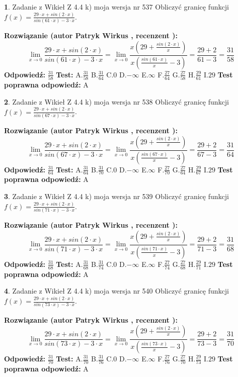 \documentclass[12pt, a4paper]{article}
\theoremstyle{definition} %
\newtheorem{zad}{}
\newcommand{\zadStart}[1]{\begin{zad}#1\newline}
\newcommand{\zadStop}{\end{zad}}
\newcommand{\rozwStart}[2]{\noindent \textbf{Rozwiązanie (autor #1 , recenzent #2): }\newline}
\newcommand{\rozwStop}{\newline}
\newcommand{\odpStart}{\noindent \textbf{Odpowiedź:}\newline}
\newcommand{\odpStop}{\newline}
\newcommand{\testStart}{\noindent \textbf{Test:}\newline}
\newcommand{\testStop}{\newline}
\newcommand{\kluczStart}{\noindent \textbf{Test poprawna odpowiedź:}\newline}
\newcommand{\kluczStop}{\newline}
\begin{document}
\zadStart{Zadanie z Wikieł Z 4.4 k) moja wersja nr 537}
Obliczyć granicę funkcji $f(x)=\frac{29\cdot x +sin(2\cdot x)}{sin(61\cdot x) -3\cdot x}$.
\zadStop
\rozwStart{Patryk Wirkus}{}
$$\lim\limits_{x\to 0}\frac{29\cdot x +sin(2\cdot x)}{sin(61\cdot x) -3\cdot x}
=\lim\limits_{x\to 0}\frac{x(29+\frac{sin(2\cdot x)}{x})}{x(\frac{sin(61\cdot x)}{x}-3)}
=\frac{29+2}{61-3} = \frac{31}{58}$$
\rozwStop
\odpStart
$\frac{31}{58}$
\odpStop
\testStart
A.$\frac{31}{58}$
B.$\frac{31}{64}$
C.$0$
D.$-\infty$
E.$\infty$
F.$\frac{27}{64}$
G.$\frac{27}{58}$
H.$\frac{29}{61}$
I.$29$
\testStop
\kluczStart
A
\kluczStop



\zadStart{Zadanie z Wikieł Z 4.4 k) moja wersja nr 538}
Obliczyć granicę funkcji $f(x)=\frac{29\cdot x +sin(2\cdot x)}{sin(67\cdot x) -3\cdot x}$.
\zadStop
\rozwStart{Patryk Wirkus}{}
$$\lim\limits_{x\to 0}\frac{29\cdot x +sin(2\cdot x)}{sin(67\cdot x) -3\cdot x}
=\lim\limits_{x\to 0}\frac{x(29+\frac{sin(2\cdot x)}{x})}{x(\frac{sin(67\cdot x)}{x}-3)}
=\frac{29+2}{67-3} = \frac{31}{64}$$
\rozwStop
\odpStart
$\frac{31}{64}$
\odpStop
\testStart
A.$\frac{31}{64}$
B.$\frac{31}{70}$
C.$0$
D.$-\infty$
E.$\infty$
F.$\frac{27}{70}$
G.$\frac{27}{64}$
H.$\frac{29}{67}$
I.$29$
\testStop
\kluczStart
A
\kluczStop



\zadStart{Zadanie z Wikieł Z 4.4 k) moja wersja nr 539}
Obliczyć granicę funkcji $f(x)=\frac{29\cdot x +sin(2\cdot x)}{sin(71\cdot x) -3\cdot x}$.
\zadStop
\rozwStart{Patryk Wirkus}{}
$$\lim\limits_{x\to 0}\frac{29\cdot x +sin(2\cdot x)}{sin(71\cdot x) -3\cdot x}
=\lim\limits_{x\to 0}\frac{x(29+\frac{sin(2\cdot x)}{x})}{x(\frac{sin(71\cdot x)}{x}-3)}
=\frac{29+2}{71-3} = \frac{31}{68}$$
\rozwStop
\odpStart
$\frac{31}{68}$
\odpStop
\testStart
A.$\frac{31}{68}$
B.$\frac{31}{74}$
C.$0$
D.$-\infty$
E.$\infty$
F.$\frac{27}{74}$
G.$\frac{27}{68}$
H.$\frac{29}{71}$
I.$29$
\testStop
\kluczStart
A
\kluczStop



\zadStart{Zadanie z Wikieł Z 4.4 k) moja wersja nr 540}
Obliczyć granicę funkcji $f(x)=\frac{29\cdot x +sin(2\cdot x)}{sin(73\cdot x) -3\cdot x}$.
\zadStop
\rozwStart{Patryk Wirkus}{}
$$\lim\limits_{x\to 0}\frac{29\cdot x +sin(2\cdot x)}{sin(73\cdot x) -3\cdot x}
=\lim\limits_{x\to 0}\frac{x(29+\frac{sin(2\cdot x)}{x})}{x(\frac{sin(73\cdot x)}{x}-3)}
=\frac{29+2}{73-3} = \frac{31}{70}$$
\rozwStop
\odpStart
$\frac{31}{70}$
\odpStop
\testStart
A.$\frac{31}{70}$
B.$\frac{31}{76}$
C.$0$
D.$-\infty$
E.$\infty$
F.$\frac{27}{76}$
G.$\frac{27}{70}$
H.$\frac{29}{73}$
I.$29$
\testStop
\kluczStart
A
\kluczStop
\end{document}
